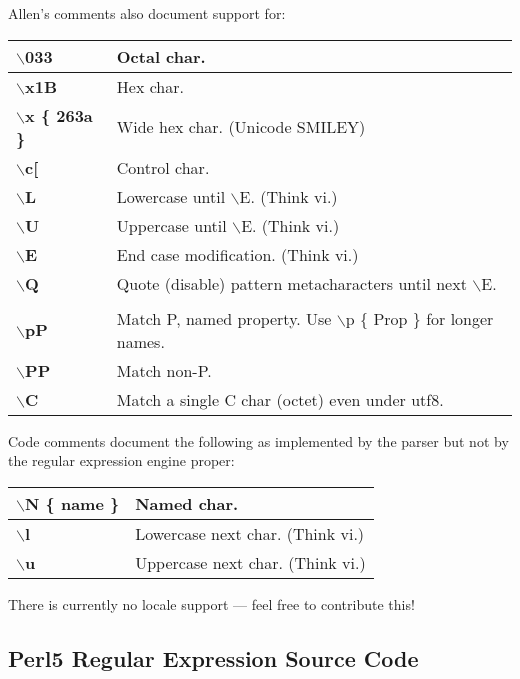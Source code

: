 Allen's comments also document support for:

\begin{tabular}{|l|l|} \hline
{\bf $\backslash$033}   &   Octal char.  \\ \hline
{\bf $\backslash$x1B}   &    Hex char.  \\ \hline
{\bf $\backslash$x \{ 263a \}}  &  Wide hex char.         (Unicode SMILEY)  \\ \hline
{\bf $\backslash$c[ }   &    Control char.  \\ \hline
{\bf $\backslash$L }    &   Lowercase until $\backslash$E. (Think vi.)  \\ \hline
{\bf $\backslash$U }    &   Uppercase until $\backslash$E. (Think vi.)  \\ \hline
{\bf $\backslash$E }    &   End case modification. (Think vi.)  \\ \hline
{\bf $\backslash$Q }    &   Quote (disable) pattern metacharacters until next $\backslash$E.  \\ \hline
              &   \\ \hline
{\bf $\backslash$pP } & Match P, named property.  Use $\backslash$p \{ Prop \} for longer names.   \\ \hline
{\bf $\backslash$PP } & Match non-P.    \\ \hline
{\bf $\backslash$C } &  Match a single C char (octet) even under utf8.    \\ \hline
\end{tabular}

Code comments document the following as implemented by the 
parser but not by the regular expression engine proper:

\begin{tabular}{|l|l|} \hline
{\bf $\backslash$N \{ name \}} &  Named char.  \\ \hline
{\bf $\backslash$l }    &   Lowercase next char. (Think vi.) \\ \hline
{\bf $\backslash$u }    &    Uppercase next char. (Think vi.) \\ \hline
\end{tabular}

There is currently no locale support --- feel free to contribute this!

\cutend*

\subsection{Perl5 Regular Expression Source Code}
\label{section:libref:perl5-regular-expressions:source-code}

